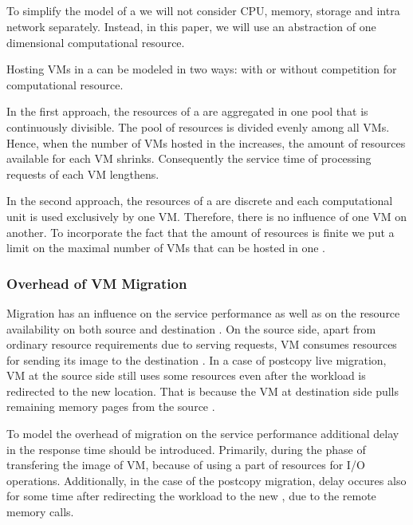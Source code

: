 \subsection{\Dc{}}
To simplify the model of a \dc{} we will not consider CPU, memory, storage and intra \dc{} network separately.
Instead, in this paper, we will use an abstraction of one dimensional computational resource.

Hosting VMs in a \dc{} can be modeled in two ways: with or without competition for computational resource.

In the first approach, the resources of a \dc{} are aggregated in one pool that is continuously divisible.
The pool of resources is divided evenly among all VMs.
Hence, when the number of VMs hosted in the \dc{} increases, the amount of resources available for each VM shrinks.
Consequently the service time of processing requests of each VM lengthens.

In the second approach, the resources of a \dc{} are discrete and each computational unit is used exclusively by one VM.
Therefore, there is no influence of one VM on another.
To incorporate the fact that the amount of resources is finite we put a limit on the maximal number of VMs that can be hosted in one \dc{}.

\subsubsection{Overhead of VM Migration}
Migration has an influence on the service performance as well as on the resource availability on both source and destination \dc{}.
On the source side, apart from ordinary resource requirements due to serving requests, VM consumes resources for sending its image to the destination \dc{}.
In a case of postcopy live migration, VM at the source side still uses some resources even after the workload is redirected to the new location.
That is because the VM at destination side pulls remaining memory pages from the source \dc{}.


To model the overhead of migration on the service performance additional delay in the response time should be introduced.
Primarily, during the phase of transfering the image of VM, because of using a part of resources for I/O operations.
Additionally, in the case of the postcopy migration, delay occures also for some time after redirecting the workload to the new \dc{}, due to the remote memory calls.

